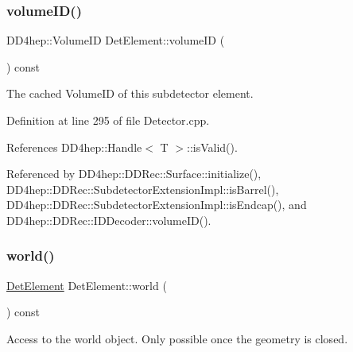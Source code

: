 \hypertarget{class_d_d4hep_1_1_geometry_1_1_det_element_a022a45351d2af92863c180522759e0ce}{}\label{class_d_d4hep_1_1_geometry_1_1_det_element_a022a45351d2af92863c180522759e0ce} 
\subsubsection{\texorpdfstring{volume\+I\+D()}{volumeID()}}
{\footnotesize\ttfamily D\+D4hep\+::\+Volume\+ID Det\+Element\+::volume\+ID (\begin{DoxyParamCaption}{ }\end{DoxyParamCaption}) const}



The cached Volume\+ID of this subdetector element. 



Definition at line 295 of file Detector.\+cpp.



References D\+D4hep\+::\+Handle$<$ T $>$\+::is\+Valid().



Referenced by D\+D4hep\+::\+D\+D\+Rec\+::\+Surface\+::initialize(), D\+D4hep\+::\+D\+D\+Rec\+::\+Subdetector\+Extension\+Impl\+::is\+Barrel(), D\+D4hep\+::\+D\+D\+Rec\+::\+Subdetector\+Extension\+Impl\+::is\+Endcap(), and D\+D4hep\+::\+D\+D\+Rec\+::\+I\+D\+Decoder\+::volume\+I\+D().

\hypertarget{class_d_d4hep_1_1_geometry_1_1_det_element_ae073e3c383594d3deedba39172906a84}{}\label{class_d_d4hep_1_1_geometry_1_1_det_element_ae073e3c383594d3deedba39172906a84} 
\subsubsection{\texorpdfstring{world()}{world()}}
{\footnotesize\ttfamily \hyperlink{class_d_d4hep_1_1_geometry_1_1_det_element}{Det\+Element} Det\+Element\+::world (\begin{DoxyParamCaption}{ }\end{DoxyParamCaption}) const}



Access to the world object. Only possible once the geometry is closed. 



